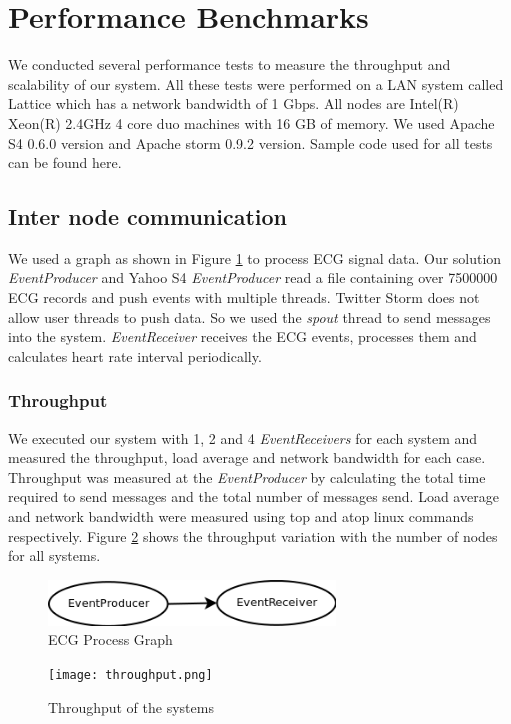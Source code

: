 \section{Performance Benchmarks}

We conducted several performance tests to measure the throughput and scalability of our system. All these tests were performed on a LAN system called Lattice which has a network bandwidth of 1 Gbps. All nodes are Intel(R) Xeon(R) 2.4GHz 4 core duo machines with 16 GB of memory. We used Apache S4 0.6.0 version and Apache storm 0.9.2 version. Sample code used for all tests can be found here\cite{solutionCode}.


\subsection{Inter node communication}
We used a graph as shown in Figure \ref{ecgGraph} to process ECG signal data. Our solution \textit{EventProducer} and Yahoo S4\cite{neumeyer2010s4} \textit{EventProducer} read a file containing over 7500000 ECG records and push events with multiple threads. Twitter Storm\cite{twitterStorm} does not allow user threads to push data. So we used the \textit{spout} thread to send messages into the system. \textit{EventReceiver}  receives the ECG events, processes them and calculates heart rate interval periodically.  

\subsubsection{Throughput}
We executed our system with 1, 2 and 4  \textit{EventReceivers} for each system and measured the throughput, load average and network bandwidth for each case. Throughput was measured at the \textit{EventProducer} by calculating the total time required to send messages and the total number of messages send. Load average and network bandwidth were measured using top and atop linux commands respectively. Figure \ref{throuput} shows the throughput variation with the number of nodes for all systems. 

\begin{figure}[!t]
        \centering
        \includegraphics[width=3.0in]{ecgGraph.png}
        \caption{ECG Process Graph}
        \label{ecgGraph}
\end{figure}
\begin{figure}[!t]
        \centering
        \texttt{[image: throughput.png]}
        \caption{Throughput of the systems}
        \label{throuput}
\end{figure}

